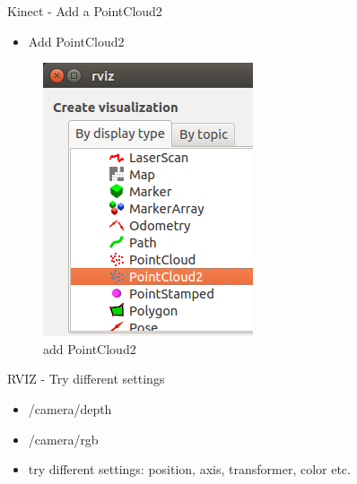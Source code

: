 \documentclass{beamer}
\begin{document}
\begin{frame}{Kinect - Add a PointCloud2}	

\begin{itemize}
	\item Add PointCloud2
\end{itemize}

		\begin{figure}[H]
			\centering
			\includegraphics[scale=0.4]{./Images/Add_PointCloud2.png}
			\caption{add PointCloud2}
			\label{fig:ros_add_pointcloud}
		\end{figure}
		
\end{frame}


\begin{frame}{RVIZ - Try different settings}	

	\begin{itemize}
		\item /camera/depth
		\item /camera/rgb
		\item try different settings: position, axis, transformer, color etc.
	\end{itemize}
\end{frame}


\end{document}
